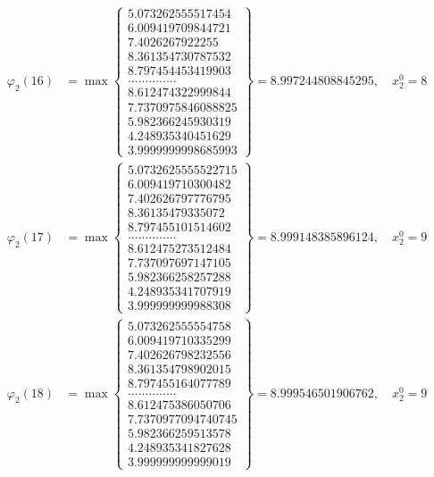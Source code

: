 \documentclass{article}
\begin{document}
\begin{align*}
  
  
  
\varphi_{2}(16) &= \max \left\{ \begin{array}{c}
5.073262555517454 \\
 6.009419709844721 \\
 7.4026267922255 \\
 8.361354730787532 \\
 8.797454453419903 \\
 .............. \\
 8.612474322999844 \\
 7.7370975846088825 \\
 5.982366245930319 \\
 4.248935340451629 \\
 3.9999999998685993
\end{array} \right\} = 8.997244808845295, \quad x_{2}^0 = 8\\
  
  
  
  
\varphi_{2}(17) &= \max \left\{ \begin{array}{c}
5.0732625555522715 \\
 6.009419710300482 \\
 7.402626797776795 \\
 8.36135479335072 \\
 8.797455101514602 \\
 .............. \\
 8.612475273512484 \\
 7.737097697147105 \\
 5.982366258257288 \\
 4.248935341707919 \\
 3.999999999988308
\end{array} \right\} = 8.999148385896124, \quad x_{2}^0 = 9\\
  
  
  
  
\varphi_{2}(18) &= \max \left\{ \begin{array}{c}
5.073262555554758 \\
 6.009419710335299 \\
 7.402626798232556 \\
 8.361354798902015 \\
 8.797455164077789 \\
 .............. \\
 8.612475386050706 \\
 7.7370977094740745 \\
 5.982366259513578 \\
 4.248935341827628 \\
 3.999999999999019
\end{array} \right\} = 8.999546501906762, \quad x_{2}^0 = 9\\
  

\end{align*}
\end{document}
